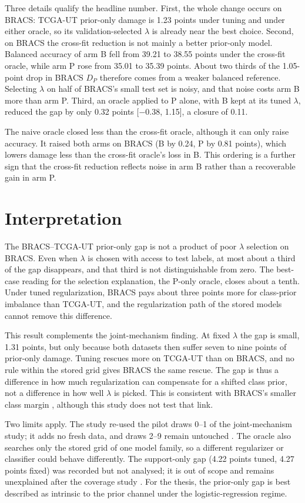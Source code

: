 \documentclass[11pt]{article}
\begin{document}
\noindent Three details qualify the headline number. First, the whole change occurs on BRACS: TCGA-UT prior-only damage is 1.23 points under tuning and under either oracle, so its validation-selected $\lambda$ is already near the best choice. Second, on BRACS the cross-fit reduction is not mainly a better prior-only model. Balanced accuracy of arm B fell from 39.21 to 38.55 points under the cross-fit oracle, while arm P rose from 35.01 to 35.39 points. About two thirds of the 1.05-point drop in BRACS $D_P$ therefore comes from a weaker balanced reference. Selecting $\lambda$ on half of BRACS's small test set is noisy, and that noise costs arm B more than arm P. Third, an oracle applied to P alone, with B kept at its tuned $\lambda$, reduced the gap by only 0.32 points [$-0.38$, 1.15], a closure of 0.11.

The naive oracle closed less than the cross-fit oracle, although it can only raise accuracy. It raised both arms on BRACS (B by 0.24, P by 0.81 points), which lowers damage less than the cross-fit oracle's loss in B. This ordering is a further sign that the cross-fit reduction reflects noise in arm B rather than a recoverable gain in arm P.

\section{Interpretation}
\label{sec:interpretation}
The BRACS--TCGA-UT prior-only gap is not a product of poor $\lambda$ selection on BRACS. Even when $\lambda$ is chosen with access to test labels, at most about a third of the gap disappears, and that third is not distinguishable from zero. The best-case reading for the selection explanation, the P-only oracle, closes about a tenth. Under tuned regularization, BRACS pays about three points more for class-prior imbalance than TCGA-UT, and the regularization path of the stored models cannot remove this difference.

This result complements the joint-mechanism finding. At fixed $\lambda$ the gap is small, 1.31 points, but only because both datasets then suffer seven to nine points of prior-only damage. Tuning rescues more on TCGA-UT than on BRACS, and no rule within the stored grid gives BRACS the same rescue. The gap is thus a difference in how much regularization can compensate for a shifted class prior, not a difference in how well $\lambda$ is picked. This is consistent with BRACS's smaller class margin \citep{queisler2026classProperties}, although this study does not test that link.

Two limits apply. The study re-used the pilot draws 0--1 of the joint-mechanism study; it adds no fresh data, and draws 2--9 remain untouched \citep{dwork2015reusable}. The oracle also searches only the stored grid of one model family, so a different regularizer or classifier could behave differently. The support-only gap (4.22 points tuned, 4.27 points fixed) was recorded but not analysed; it is out of scope and remains unexplained after the coverage study \citep{queisler2026supportCoverage}. For the thesis, the prior-only gap is best described as intrinsic to the prior channel under the logistic-regression regime.



\end{document}
